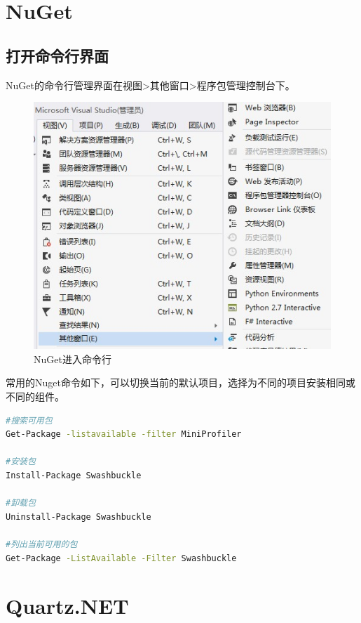 \documentclass{book}
\begin{document}
\section{NuGet}

\subsection{打开命令行界面}

NuGet的命令行管理界面在视图>其他窗口>程序包管理控制台下。

\begin{figure}[htbp]
	\centering
	\includegraphics[scale=0.6]{NuGetProgramManageConsole.jpg}
	\caption{NuGet进入命令行}
	\label{fig:NuGetProgramManageConsole}
\end{figure}

常用的Nuget命令如下，可以切换当前的默认项目，选择为不同的项目安装相同或不同的组件。

\begin{lstlisting}[language=Bash]
#搜索可用包
Get-Package -listavailable -filter MiniProfiler

#安装包
Install-Package Swashbuckle

#卸载包
Uninstall-Package Swashbuckle

#列出当前可用的包
Get-Package -ListAvailable -Filter Swashbuckle
\end{lstlisting}


\section{Quartz.NET}
\end{document}
